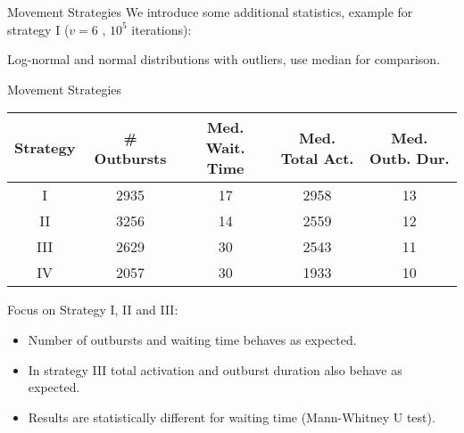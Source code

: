 \documentclass[red]{beamer}
\begin{document}
\begin{frame}{Movement Strategies}
  We introduce some additional statistics, example for strategy I ($v = 6$ , $10^5$ iterations):
  \begin{figure}[H]
    \centering
    \label{fig:dist}
  \end{figure}

  Log-normal and normal distributions with outliers, use median for comparison.
\end{frame}

\begin{frame}{Movement Strategies}
  \begin{table}[H]
    \footnotesize
    \centering
    \begin{tabular}{c | c | c | c | c}
      Strategy & \# Outbursts & Med. Wait. Time & Med. Total Act. & Med. Outb. Dur. \\
      \hline
      I & 2935 & 17 & 2958 & 13 \\
      II & 3256 & 14 & 2559 & 12 \\
      III & 2629 & 30 & 2543 & 11 \\
      IV & 2057 & 30 & 1933 & 10
    \end{tabular}
    \label{tab:results}
  \end{table}
  Focus on Strategy I, II and III:\\
  \begin{itemize}
  \item
    Number of outbursts and waiting time behaves as expected.
  \item
    In strategy III total activation and outburst duration also behave as expected.
  \item
    Results are statistically different for waiting time (Mann-Whitney U test).
  \end{itemize}
  \let\thefootnote\relax{}
\end{frame}
\end{document}
